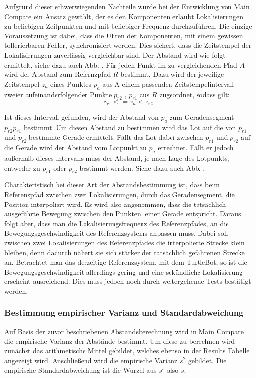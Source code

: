 Aufgrund dieser schwerwiegenden Nachteile wurde bei der Entwicklung von Main
Compare ein Ansatz gewählt, der es den Komponenten erlaubt Lokalisierungen zu
beliebigen Zeitpunkten und mit beliebiger Frequenz durchzuführen. Die einzige
Voraussetzung ist dabei, dass die Uhren der Komponenten, mit einem gewissen
tollerierbaren Fehler, synchronisiert werden. Dies sichert, dass die Zeitstempel der
Lokalisierungen zuverlässig vergleichbar sind. Der Abstand wird wie folgt
ermittelt, siehe dazu auch Abb. . Für jeden Punkt im zu vergleichenden Pfad $A$
wird der Abstand zum Refernzpfad $R$ bestimmt. Dazu wird der jeweilige
Zeitstempel $z_a$ eines Punktes $p_a$ aus A einem passenden
Zeitstempelintervall zweier aufeinanderfolgender Punkte $p_{r2}$ , $p_{r1}$ aus $R$ zugeordnet, sodass
gilt:
\[
z_{r1} <= z_a < z_{r2}
\]

Ist dieses Intervall gefunden, wird der Abstand von $p_a$ zum Geradensegment
$\overline{p_{r2} p_{r1}}$ bestimmt. Um diesen Abstand zu bestimmen wird das
Lot auf die von $p_{r1}$ und $p_{r2}$ bestimmte Gerade ermittelt. Fällt das Lot
dabei zwischen $p_{r1}$ und $p_{r2}$ auf die Gerade wird der Abstand vom
Lotpunkt zu $p_a$ errechnet. Fällt er jedoch außerhalb dieses Intervalls muss
der Abstand, je nach Lage des Lotpunkts, entweder zu $p_{r1}$ oder $p_{r2}$
bestimmt werden. Siehe dazu auch Abb. .

Charakteristisch bei dieser Art der Abstandsbestimmung ist, dass beim
Referenzpfad zwischen zwei Lokalisierungen, durch das Geradensegment, die
Position interpoliert wird. Es wird also angenommen, dass die tatsächlich
ausgeführte Bewegung zwischen den Punkten, einer Gerade entspricht. Daraus
folgt aber, dass man die Lokalisierungsfrequenz des Referenzpfades, an die
Bewegungsgeschwindigkeit des Referenzsystems anpassen muss. Dabei soll
zwischen zwei Lokalisierungen des Referenzpfades die interpolierte Strecke
klein bleiben, denn dadurch nähert sie sich stärker der tatsächlich gefahrenen
Strecke an. Betrachtet man das derzeitige Referenzsystem, mit dem TurtleBot, so
ist die Bewegungsgeschwindigkeit allerdings gering und eine sekündliche
Lokalisierung erscheint ausreichend. Dies muss jedoch noch durch weitergehende
Tests bestätigt werden.


\subsubsection{Bestimmung empirischer Varianz und Standardabweichung}
Auf Basis der zuvor beschriebenen Abstandsberechnung wird in Main Compare die
empirische Varianz der Abstände bestimmt. Um diese zu berechnen wird zunächst
das arithmetische Mittel gebildet, welches ebenso in der Results Tabelle angezeigt wird.
Anschließend wird die empirische Varianz $s^2$ gebildet. Die empirische Standardabweichung
ist die Wurzel aus $s^s$ also $s$.


